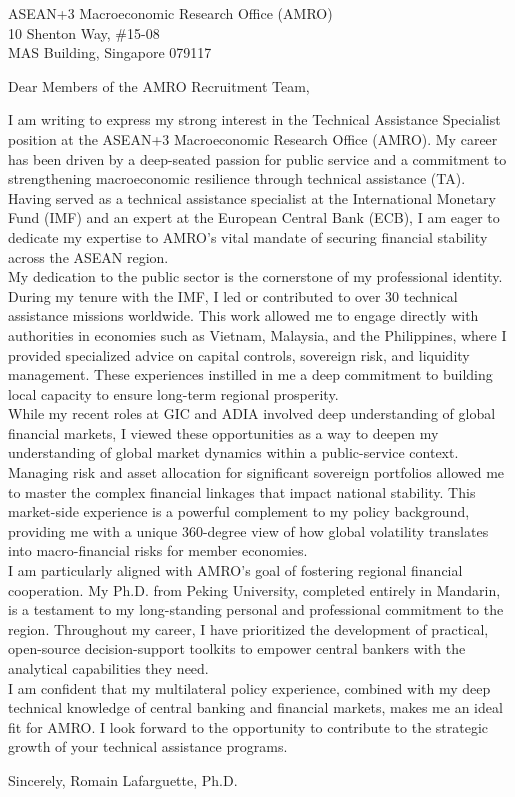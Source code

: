 \documentclass[11pt,a4paper]{letter}
\begin{document}
\begin{letter}{
    ASEAN+3 Macroeconomic Research Office (AMRO) \\
    10 Shenton Way, \#15-08 \\
    MAS Building, Singapore 079117
}


\vspace{0.5cm}
\opening{Dear Members of the AMRO Recruitment Team,}

I am writing to express my strong interest in the Technical Assistance Specialist position at the ASEAN+3 Macroeconomic Research Office (AMRO). My career has been driven by a deep-seated passion for public service and a commitment to strengthening macroeconomic resilience through technical assistance (TA). Having served as a technical assistance specialist at the International Monetary Fund (IMF) and an expert at the European Central Bank (ECB), I am eager to dedicate my expertise to AMRO's vital mandate of securing financial stability across the ASEAN region.\\

My dedication to the public sector is the cornerstone of my professional identity. During my tenure with the IMF, I led or contributed to over 30 technical assistance missions worldwide. This work allowed me to engage directly with authorities in economies such as Vietnam, Malaysia, and the Philippines, where I provided specialized advice on capital controls, sovereign risk, and liquidity management. These experiences instilled in me a deep commitment to building local capacity to ensure long-term regional prosperity.\\

While my recent roles at GIC and ADIA involved deep understanding of global financial markets, I viewed these opportunities as a way to deepen my understanding of global market dynamics within a public-service context. Managing risk and asset allocation for significant sovereign portfolios allowed me to master the complex financial linkages that impact national stability. This market-side experience is a powerful complement to my policy background, providing me with a unique 360-degree view of how global volatility translates into macro-financial risks for member economies.\\

I am particularly aligned with AMRO's goal of fostering regional financial cooperation. My Ph.D. from Peking University, completed entirely in Mandarin, is a testament to my long-standing personal and professional commitment to the region. Throughout my career, I have prioritized the development of practical, open-source decision-support toolkits to empower central bankers with the analytical capabilities they need.\\

I am confident that my multilateral policy experience, combined with my deep technical knowledge of central banking and financial markets, makes me an ideal fit for AMRO. I look forward to the opportunity to contribute to the strategic growth of your technical assistance programs.\\

\closing{Sincerely, Romain Lafarguette, Ph.D.}

\end{letter}
\end{document}

